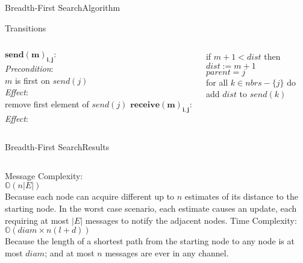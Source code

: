 \documentclass[pdf]{beamer}
\begin{document}
\begin{frame}{Breadth-First Search}{Algorithm}
	\begin{block}{Transitions}
        \vspace{2mm}
        \begin{columns}
            $\mathbf{send(m)_{i, j}:}$\\ 
                \emph{Precondition}: \\ 
                \small $m$ is first on $send(j)$ \\
                \normalsize \emph{Effect}: \\
                \small remove first element of $send(j)$
            \normalsize $\mathbf{receive(m)_{i, j}: }$ \\
                \emph{Effect}: \\
                \small
                \begin{tcolorbox}[colframe=red]
                    if $m+1 < dist$ then \\
                    \hspace*{\parindent} $dist := m+1$ \\
                    \hspace*{\parindent} $parent = j$ \\
                    \hspace*{\parindent} for all $k \in nbrs - \{j\}$ do \\
                    \hspace*{\parindent} \hspace*{\parindent} add $dist$ to $send(k)$ \\
                \end{tcolorbox}
        \end{columns}
	\end{block}
\end{frame}

\begin{frame}{Breadth-First Search}{Results}
    \begin{columns}
            Message Complexity: \\
            \hspace*{\parindent} $\mathbb{O}(n|E|)$ \\
            \pause
            \small
            Because each node can acquire different up to $n$ estimates of its distance to the starting node. In the worst case scenario, each estimate causes an update, each requiring at most $|E|$ messages to notify the adjacent nodes.
        \pause
            \normalsize
            Time Complexity:
            \hspace*{\parindent} $\mathbb{O}(diam \times n(l + d))$ \\
            \pause
            \small
            Because the length of a shortest path from the starting node to any node is at most $diam$; and at most $n$ messages are ever in any channel. \\
           
    \end{columns} 
\end{frame}
\end{document}
